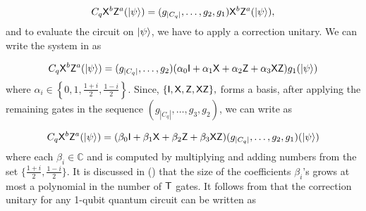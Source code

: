 \begin{equation}
\label{eq:pgate4}
C_q {\sf X}^b{\sf Z}^a ({\lvert}\psi\rangle)=(g_{|C_q|},\ldots,g_2,g_1 ){\sf X}^b{\sf Z}^a ({\lvert}\psi\rangle),
\end{equation}
and to evaluate the circuit on ${\lvert}\psi\rangle$, we have to apply a correction unitary. We can write the system in  as

\begin{equation}
\begin{aligned}
\label{eq:pgate5}
C_q {\sf X}^b{\sf Z}^a ({\lvert}\psi\rangle)=(g_{|C_q|},\ldots,g_2)(\alpha_0 {\sf I} +  \alpha_1 {\sf X} + \alpha_2 {\sf Z} + \alpha_3 {\sf X} {\sf Z})g_1 ({\lvert}\psi\rangle)
\end{aligned}
\end{equation}
 where $\alpha_i \in\left\{0,1, \frac{1+i}{2}, \frac{1-i}{2}\right\}.$ Since, $\{{\sf I}, {\sf X}, {\sf Z}, {\sf X} {\sf Z}\},$ forms a basis, after applying the remaining gates in the sequence  $(g_{|C_q|},\ldots,g_3,g_2)$, we can write  as

\begin{equation}
\begin{aligned}
\label{eq:pgate8}
C_q {\sf X}^b{\sf Z}^a ({\lvert}\psi\rangle)=(\beta_0 {\sf I} +  \beta_1 {\sf X} + \beta_2 {\sf Z} + \beta_3{\sf X} {\sf Z})(g_{|C_q|},\ldots,g_2,g_1 )({\lvert}\psi\rangle)
\end{aligned}
\end{equation}
where each $\beta_i\in\mathbb{C}$  and is computed by multiplying and adding numbers from the set $\{\frac{1+i}{2},\frac{1-i}{2}\}.$ It is discussed in () that the size of the coefficients $\beta_i$'s grows at most a polynomial in the number of ${\sf T}$ gates. It follows from   that the correction unitary for any 1-qubit quantum circuit can be written as 

